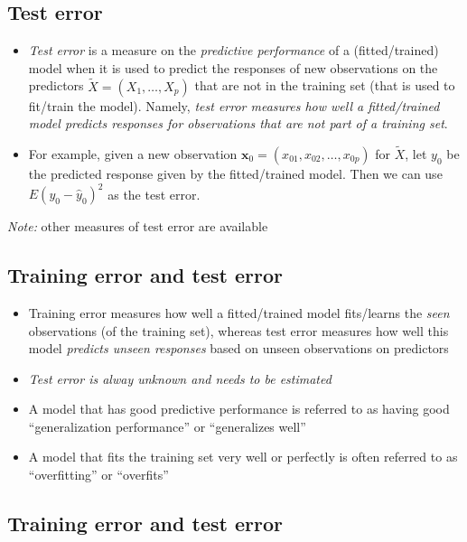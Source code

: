 \documentclass[]{article}
\providecommand{\tightlist}{%
  \setlength{\itemsep}{0pt}\setlength{\parskip}{0pt}}
\begin{document}
\subsection{Test error}\label{test-error}

\begin{itemize}
\tightlist
\item
  \emph{Test error} is a measure on the \emph{predictive performance} of
  a (fitted/trained) model when it is used to predict the responses of
  new observations on the predictors \(\tilde{X}=(X_1,\ldots,X_p)\) that
  are not in the training set (that is used to fit/train the model).
  Namely, \emph{test error measures how well a fitted/trained model
  predicts responses for observations that are not part of a training
  set}.
\item
  For example, given a new observation
  \(\mathbf{x}_0=(x_{01},x_{02},\ldots,x_{0p})\) for \(\tilde{X}\), let
  \(y_0\) be the predicted response given by the fitted/trained model.
  Then we can use \(E(y_0 -\hat{y}_0)^2\) as the test error.
\end{itemize}

\emph{Note:} other measures of test error are available

\subsection{Training error and test
error}\label{training-error-and-test-error}

\begin{itemize}
\tightlist
\item
  Training error measures how well a fitted/trained model fits/learns
  the \emph{seen} observations (of the training set), whereas test error
  measures how well this model \emph{predicts unseen responses} based on
  unseen observations on predictors
\item
  \emph{Test error is alway unknown and needs to be estimated}
\item
  A model that has good predictive performance is referred to as having
  good ``generalization performance'' or ``generalizes well''
\item
  A model that fits the training set very well or perfectly is often
  referred to as ``overfitting'' or ``overfits''
\end{itemize}

\subsection{Training error and test
error}\label{training-error-and-test-error-1}
\end{document}
